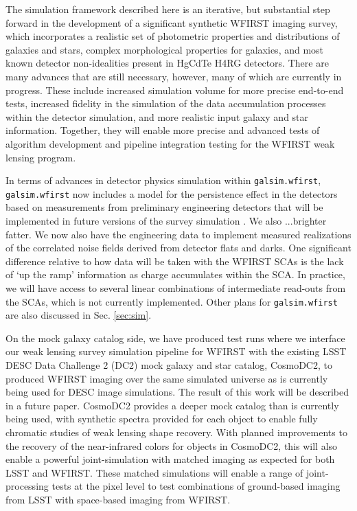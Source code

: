 \documentclass[aps,prd, amsmath,amssymb,superscriptaddress,showkeys,nofootinbib,reprint,preprintnumbers]{revtex4-1}
\begin{document}
The simulation framework described here is an iterative, but substantial step forward in the development of a significant synthetic WFIRST imaging survey, which incorporates a realistic set of photometric properties and distributions of galaxies and stars, complex morphological properties for galaxies, and most known detector non-idealities present in HgCdTe H4RG detectors. 
There are many advances that are still necessary, however, many of which are currently in progress. 
These include increased simulation volume for more precise end-to-end tests, increased fidelity in the simulation of the data accumulation processes within the detector simulation, and more realistic input galaxy and star information. 
Together, they will enable more precise and advanced tests of algorithm development and pipeline integration testing for the WFIRST weak lensing program.

In terms of advances in detector physics simulation within \texttt{galsim.wfirst}, \texttt{galsim.wfirst} now includes a model for the persistence effect in the detectors based on measurements from preliminary engineering detectors that will be implemented in future versions of the survey simulation \cite{}. 
We also ...brighter fatter.  
We now also have the engineering data to implement measured realizations of the correlated noise fields derived from detector flats and darks. 
One significant difference relative to how data will be taken with the WFIRST SCAs is the lack of `up the ramp' information as charge accumulates within the SCA. 
In practice, we will have access to several linear combinations of intermediate read-outs from the SCAs, which is not currently implemented. 
Other plans for \texttt{galsim.wfirst} are also discussed in Sec. \ref{sec:sim}.

On the mock galaxy catalog side, we have produced test runs where we interface our weak lensing survey simulation pipeline for WFIRST with the existing LSST DESC Data Challenge 2 (DC2) mock galaxy and star catalog, CosmoDC2, to produced WFIRST imaging over the same simulated universe as is currently being used for DESC image simulations. 
The result of this work will be described in a future paper. CosmoDC2 provides a deeper mock catalog than is currently being used, with synthetic spectra provided for each object to enable fully chromatic studies of weak lensing shape recovery. 
With planned improvements to the recovery of the near-infrared colors for objects in CosmoDC2, this will also enable a powerful joint-simulation with matched imaging as expected for both LSST and WFIRST. 
These matched simulations will enable a range of joint-processing tests at the pixel level to test combinations of ground-based imaging from LSST with space-based imaging from WFIRST.
\end{document}

